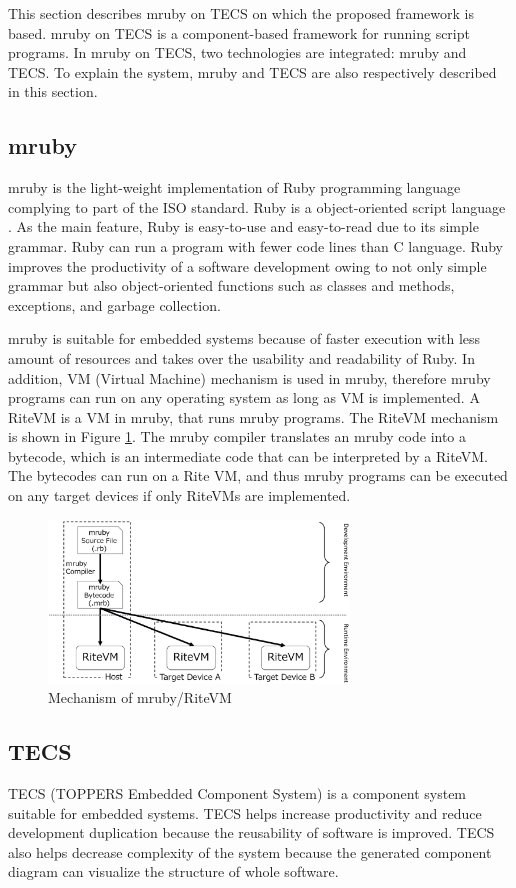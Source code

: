\documentclass{sig-alternate-05-2015}
\begin{document}
This section describes mruby on TECS on which the proposed framework is based.
mruby on TECS is a component-based framework for running script programs.
In mruby on TECS, two technologies are integrated: mruby and TECS.
To explain the system, mruby and TECS are also respectively described in this section.

\subsection{mruby}
\label{sec:mruby}
mruby is the light-weight implementation of Ruby programming language complying to part of the ISO standard.
Ruby is a object-oriented script language \cite{url:Ruby}.
As the main feature, Ruby is easy-to-use and easy-to-read due to its simple grammar.
Ruby can run a program with fewer code lines than C language.
Ruby improves the productivity of a software development owing to not only simple grammar but also object-oriented functions such as classes and methods, exceptions, and garbage collection.

mruby is suitable for embedded systems because of faster execution with less amount of resources and takes over the usability and readability of Ruby.
In addition, VM (Virtual Machine) mechanism is used in mruby, therefore mruby programs can run on any operating system as long as VM is implemented.
A RiteVM is a VM in mruby, that runs mruby programs.
The RiteVM mechanism is shown in Figure \ref{fig:mruby}.
The mruby compiler translates an mruby code into a bytecode, which is an intermediate code that can be interpreted by a RiteVM.
The bytecodes can run on a Rite VM, and thus mruby programs can be executed on any target devices if only RiteVMs are implemented.
\begin{figure}[t]
    \centering
    \includegraphics[width=8cm,clip]{figure/mruby.eps}
    \caption{Mechanism of mruby/RiteVM}
    \label{fig:mruby}
\end{figure}

\subsection{TECS}
\label{sec:TECS}
TECS (TOPPERS Embedded Component System) is a component system suitable for embedded systems.
TECS helps increase productivity and reduce development duplication because the reusability of software is improved.
TECS also helps decrease complexity of the system because the generated component diagram can visualize the structure of whole software.
\end{document}
